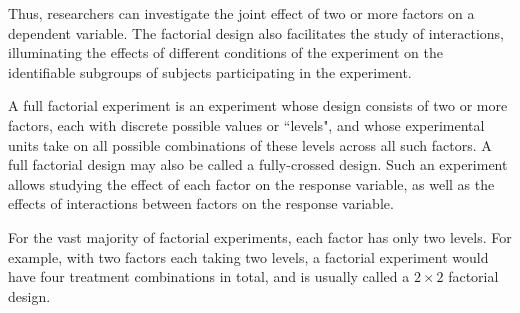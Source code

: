 Thus, researchers can investigate the joint effect of two or more factors on a dependent variable. The factorial design also facilitates the study of interactions, illuminating the effects of different conditions of the experiment on the identifiable subgroups of subjects participating in the experiment.


A full factorial experiment is an experiment whose design consists of two or more factors, each with discrete possible values or ``levels", and whose experimental units take on all possible combinations of these levels across all such factors. A full factorial design may also be called a fully-crossed design. Such an experiment allows studying the effect of each factor on the response variable, as well as the effects of interactions between factors on the response variable.

For the vast majority of factorial experiments, each factor has only two levels. For example, with two factors each taking two levels, a factorial experiment would have four treatment combinations in total, and is usually called a $2\times2$ factorial design.

\newpage

